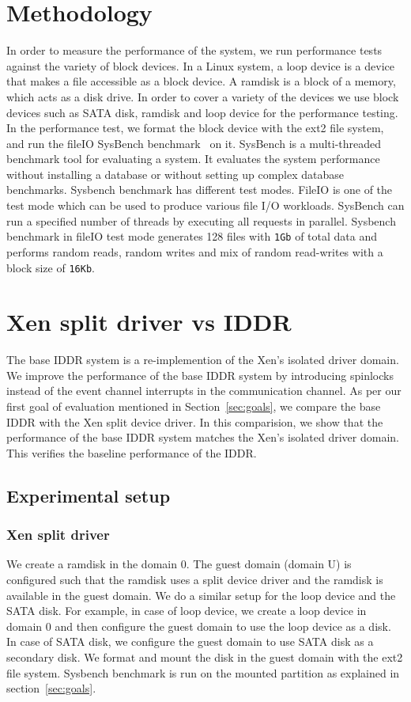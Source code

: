 \section{Methodology}
In order to measure the performance of the system, we run performance tests against the variety of block devices. In a Linux system, a loop device is a device that makes a file accessible as a block device. A ramdisk is a block of a memory, which acts as a disk drive. In order to cover a variety of the devices we use block devices such as SATA disk, ramdisk and loop device for the performance testing.
\\[3mm]
In the performance test, we format the block device with the ext2 file system, and run the fileIO SysBench benchmark~\cite{sysbench} on it. SysBench is a multi-threaded benchmark tool for evaluating a system. It evaluates the system performance without installing a database or without setting up complex database benchmarks. Sysbench benchmark has different test modes. FileIO is one of the test mode which can be used to produce various file I/O workloads. SysBench can run a specified number of threads by executing all requests in parallel. Sysbench benchmark in fileIO test mode generates 128 files with \texttt{1Gb} of total data and performs random reads, random writes and mix of random read-writes with a block size of \texttt{16Kb}. 

\section{Xen split driver vs IDDR}
The base IDDR system is a re-implemention of the Xen's isolated driver domain. We improve the performance of the base IDDR system by introducing spinlocks instead of the event channel interrupts in the communication channel. As per our first goal of evaluation mentioned in Section~\ref{sec:goals}, we compare the base IDDR with the Xen split device driver. In this comparision, we show that the performance of the base IDDR system matches the Xen's isolated driver domain. This verifies the baseline performance of the IDDR.

\subsection{Experimental setup}

\subsubsection*{Xen split driver}
We create a ramdisk in the domain 0. The guest domain (domain U) is configured such that the ramdisk uses a split device driver and the ramdisk is available in the guest domain. We do a similar setup for the loop device and the SATA disk. For example, in case of loop device, we create a loop device in domain 0 and then configure the guest domain to use the loop device as a disk. In case of SATA disk, we configure the guest domain to use SATA disk as a secondary disk. We format and mount the disk in the guest domain with the ext2 file system. Sysbench benchmark is run on the mounted partition as explained in section~\ref{sec:goals}.

